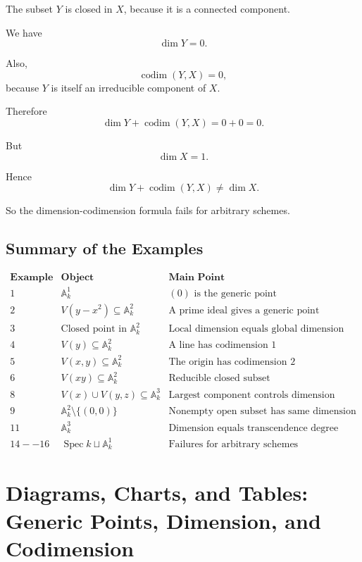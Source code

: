 \documentclass[12pt,a4paper]{article}
\theoremstyle{notespace}
\begin{document}
The subset \(Y\) is closed in \(X\), because it is a connected component.

We have
\[
\dim Y=0.
\]

Also,
\[
\operatorname{codim}(Y,X)=0,
\]
because \(Y\) is itself an irreducible component of \(X\).

Therefore
\[
\dim Y+\operatorname{codim}(Y,X)
=
0+0
=
0.
\]

But
\[
\dim X=1.
\]

Hence
\[
\boxed{
	\dim Y+\operatorname{codim}(Y,X)\neq \dim X.
}
\]

So the dimension-codimension formula fails for arbitrary schemes.

\subsection{Summary of the Examples}

\[
\begin{array}{c|c|c}
	\textbf{Example}
	&
	\textbf{Object}
	&
	\textbf{Main Point}
	\\
	\hline
	1
	&
	\mathbb A^1_k
	&
	(0)\text{ is the generic point}
	\\
	2
	&
	V(y-x^2)\subseteq \mathbb A^2_k
	&
	\text{A prime ideal gives a generic point}
	\\
	3
	&
	\text{Closed point in }\mathbb A^2_k
	&
	\text{Local dimension equals global dimension}
	\\
	4
	&
	V(y)\subseteq \mathbb A^2_k
	&
	\text{A line has codimension }1
	\\
	5
	&
	V(x,y)\subseteq \mathbb A^2_k
	&
	\text{The origin has codimension }2
	\\
	6
	&
	V(xy)\subseteq \mathbb A^2_k
	&
	\text{Reducible closed subset}
	\\
	8
	&
	V(x)\cup V(y,z)\subseteq \mathbb A^3_k
	&
	\text{Largest component controls dimension}
	\\
	9
	&
	\mathbb A^2_k\setminus\{(0,0)\}
	&
	\text{Nonempty open subset has same dimension}
	\\
	11
	&
	\mathbb A^3_k
	&
	\text{Dimension equals transcendence degree}
	\\
	14--16
	&
	\operatorname{Spec} k\sqcup \mathbb A^1_k
	&
	\text{Failures for arbitrary schemes}
\end{array}
\]
\section{Diagrams, Charts, and Tables: Generic Points, Dimension, and Codimension}
\end{document}
